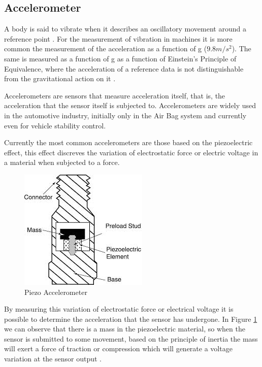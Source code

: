 \subsection{Accelerometer}\label{ssec:accelerometer}

A body is said to vibrate when it describes an oscillatory movement around a reference point \cite{joaocan2000}. For the measurement of vibration in machines it is more common the measurement of the acceleration as a function of g ($9.8m/s^2$). The same is measured as a function of g as a function of Einstein's Principle of Equivalence, where the acceleration of a reference data is not distinguishable from the gravitational action on it \cite{nordtvedt1968equivalence}.
		\par
		Accelerometers are sensors that measure acceleration itself, that is, the acceleration that the sensor itself is subjected to. Accelerometers are widely used in the automotive industry, initially only in the Air Bag system and currently even for vehicle stability control.
		\par
		Currently the most common accelerometers are those based on the piezoelectric effect, this effect discreves the variation of electrostatic force or electric voltage in a material when subjected to a force.

		\begin{figure}[htbp]
			\centering
				\includegraphics[scale=0.95]{figuras/fig-piezo-acel.jpg}
			\caption{Piezo Accelerometer \cite{piezo-accel}}
			\label{fig:piezoAccelerometer}
		\end{figure}

		By measuring this variation of electrostatic force or electrical voltage it is possible to determine the acceleration that the sensor has undergone. In Figure \ref{fig:piezoAccelerometer} we can observe that there is a mass in the piezoelectric material, so when the sensor is submitted to some movement, based on the principle of inertia the mass will exert a force of traction or compression which will generate a voltage variation at the sensor output \cite{patrick2006}.
